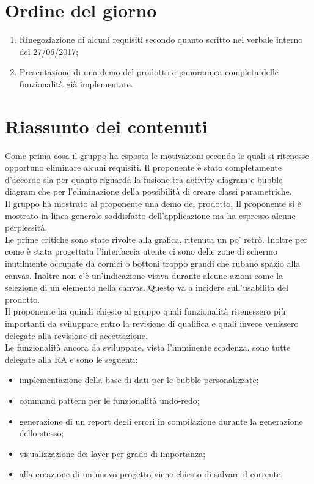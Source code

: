 \documentclass[../AnalisiDeiRequisiti.tex]{subfiles}
\begin{document}
	\section*{Ordine del giorno}
		\begin{enumerate}
			\item Rinegoziazione di alcuni requisiti secondo quanto scritto nel verbale interno del 27/06/2017;
			\item Presentazione di una demo del prodotto e panoramica completa delle funzionalità già implementate.
		\end{enumerate}
		
		\section*{Riassunto dei contenuti}
		Come prima cosa il gruppo ha esposto le motivazioni secondo le quali si ritenesse opportuno eliminare alcuni requisiti. Il proponente è stato completamente d'accordo sia per quanto riguarda la fusione tra activity diagram e bubble diagram che per l'eliminazione della possibilità di creare classi parametriche.\\
		Il gruppo ha mostrato al proponente una demo del prodotto. Il proponente si è mostrato in linea generale soddisfatto dell'applicazione ma ha espresso alcune perplessità.\\
		Le prime critiche sono state rivolte alla grafica, ritenuta un po' retrò. Inoltre per come è stata progettata l'interfaccia utente ci sono delle zone di schermo inutilmente occupate da cornici o bottoni troppo grandi che rubano spazio alla canvas. Inoltre non c'è un'indicazione visiva durante alcune azioni come la selezione di un elemento nella canvas. Questo va a incidere sull'usabilità del prodotto.\\
		Il proponente ha quindi chiesto al gruppo quali funzionalità ritenessero più importanti da sviluppare entro la revisione di qualifica e quali invece venissero delegate alla revisione di accettazione.\\
		Le funzionalità ancora da sviluppare, vista l'imminente scadenza, sono tutte delegate alla RA e sono le seguenti:
		\begin{itemize}
			\item implementazione della base di dati per le bubble personalizzate;
			\item command pattern per le funzionalità undo-redo;
			\item generazione di un report degli errori in compilazione durante la generazione dello stesso;
			\item visualizzazione dei layer per grado di importanza;
			\item alla creazione di un nuovo progetto viene chiesto di salvare il corrente.
		\end{itemize}
		
\end{document}
